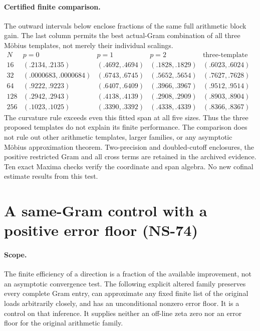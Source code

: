 \paragraph{Certified finite comparison.}
The outward intervals below enclose fractions of the same full arithmetic
block gain. The last column permits the best actual-Gram combination of
all three M\"obius templates, not merely their individual scalings.
\[
\begin{array}{c|cccc}
N& p=0&p=1&p=2&\text{three-template span}\\ \hline
16&(.2134,.2135)&(.4692,.4694)&(.1828,.1829)&(.6023,.6024)\\
32&(.0000683,.0000684)&(.6743,.6745)&(.5652,.5654)&(.7627,.7628)\\
64&(.9222,.9223)&(.6407,.6409)&(.3966,.3967)&(.9512,.9514)\\
128&(.2942,.2943)&(.4138,.4139)&(.2908,.2909)&(.8903,.8904)\\
256&(.1023,.1025)&(.3390,.3392)&(.4338,.4339)&(.8366,.8367)
\end{array}
\]
The curvature rule exceeds even this fitted span at all five sizes.
Thus the three proposed templates do not explain its finite performance.
The comparison does not rule out other arithmetic templates, larger
families, or any asymptotic M\"obius approximation theorem.
Two-precision and doubled-cutoff enclosures, the positive restricted Gram
and all cross terms are retained in the archived evidence. Ten exact
Maxima checks verify the coordinate and span algebra. No new cofinal
estimate results from this test.

\section{A same-Gram control with a positive error floor (NS-74)}
\label{sec:ns74-same-gram-control}

\paragraph{Scope.}
The finite efficiency of a direction is a fraction of the available
improvement, not an asymptotic convergence test. The following explicit
altered family preserves every complete Gram entry, can approximate any
fixed finite list of the original loads arbitrarily closely, and has an
unconditional nonzero error floor. It is a control on that inference.
It supplies neither an off-line zeta zero nor an error floor for the
original arithmetic family.

